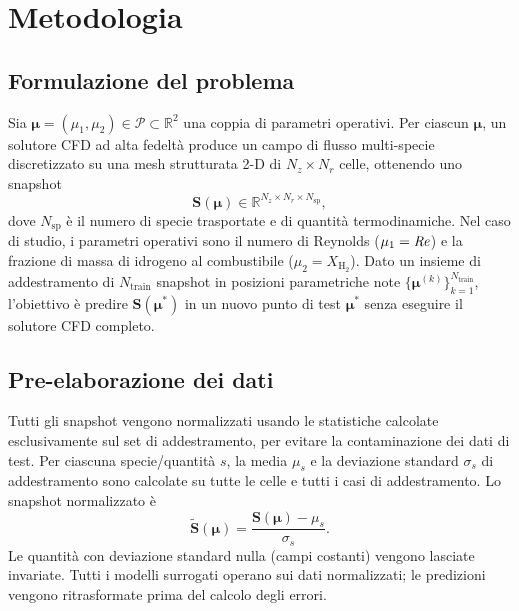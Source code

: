 \section{Metodologia}

\subsection{Formulazione del problema}

Sia $\boldsymbol{\mu} = (\mu_1, \mu_2) \in \mathcal{P} \subset \mathbb{R}^2$ una coppia di parametri operativi. Per ciascun $\boldsymbol{\mu}$, un solutore CFD ad alta fedeltà produce un campo di flusso multi-specie discretizzato su una mesh strutturata 2-D di $N_z \times N_r$ celle, ottenendo uno snapshot
\begin{equation}
    \mathbf{S}(\boldsymbol{\mu}) \in \mathbb{R}^{N_z \times N_r \times N_{\mathrm{sp}}},
\end{equation}
dove $N_{\mathrm{sp}}$ è il numero di specie trasportate e di quantità termodinamiche. Nel caso di studio, i parametri operativi sono il numero di Reynolds ($\mu_1 = \mathit{Re}$) e la frazione di massa di idrogeno al combustibile ($\mu_2 = X_{\mathrm{H_2}}$). Dato un insieme di addestramento di $N_{\mathrm{train}}$ snapshot in posizioni parametriche note $\{\boldsymbol{\mu}^{(k)}\}_{k=1}^{N_{\mathrm{train}}}$, l'obiettivo è predire $\mathbf{S}(\boldsymbol{\mu}^*)$ in un nuovo punto di test $\boldsymbol{\mu}^*$ senza eseguire il solutore CFD completo.

\subsection{Pre-elaborazione dei dati}

Tutti gli snapshot vengono normalizzati usando le statistiche calcolate esclusivamente sul set di addestramento, per evitare la contaminazione dei dati di test. Per ciascuna specie/quantità $s$, la media $\mu_s$ e la deviazione standard $\sigma_s$ di addestramento sono calcolate su tutte le celle e tutti i casi di addestramento. Lo snapshot normalizzato è
\begin{equation}
    \tilde{\mathbf{S}}(\boldsymbol{\mu}) = \frac{\mathbf{S}(\boldsymbol{\mu}) - \mu_s}{\sigma_s}.
\end{equation}
Le quantità con deviazione standard nulla (campi costanti) vengono lasciate invariate. Tutti i modelli surrogati operano sui dati normalizzati; le predizioni vengono ritrasformate prima del calcolo degli errori.

